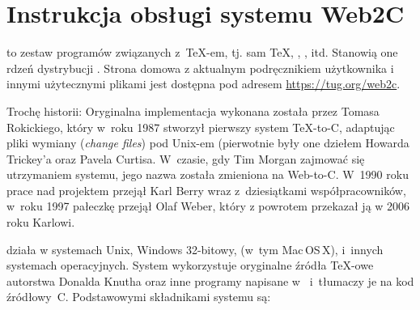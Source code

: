 \documentclass{article}
\begin{document}
%


\section{Instrukcja obsługi systemu Web2C}

\Webc{} to zestaw programów związanych z~\TeX-em, tj.  sam \TeX{}, \MF{},
\MP, \BibTeX{} itd. Stanowią one rdzeń dystrybucji \TL{}. Strona domowa \Webc{} z aktualnym
podręcznikiem użytkownika i innymi użytecznymi plikami jest dostępna pod adresem \url{https://tug.org/web2c}.

Trochę historii: Oryginalna implementacja wykonana została przez Tomasa Rokickiego, który
w~roku 1987 stworzył pierwszy system \TeX{}-to-C, adaptując pliki wymiany
(\emph{change files}) pod Unix-em (pierwotnie były one dziełem Howarda
Trickey'a oraz Pavela Curtisa.  W~czasie, gdy Tim Morgan zajmować się  utrzymaniem
systemu, jego nazwa została zmieniona na Web-to-C\@. W~1990 roku prace nad
projektem przejął Karl Berry wraz z~dziesiątkami współpracowników, w~roku
1997 pałeczkę przejął Olaf Weber, który z powrotem przekazał ją w 2006 roku Karlowi.

\Webc{} działa w systemach Unix, Windows 32-bitowy, (w~tym Mac\,OS\,X),
 i~innych systemach operacyjnych.
System wykorzystuje oryginalne źródła \TeX-owe autorstwa Donalda Knutha
oraz inne programy napisane w~\web{} i~tłumaczy je na kod źródłowy~C.
Podstawowymi składnikami systemu są:
\end{document}
